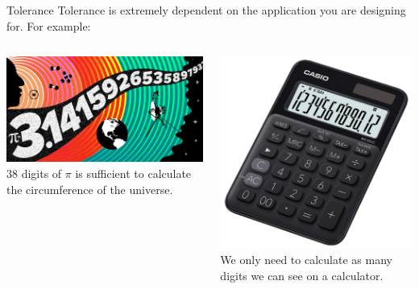 \documentclass[aspectratio=169,xcolor=dvipsnames]{beamer}
\begin{document}
\begin{frame}{Tolerance}
    Tolerance is extremely dependent on the application you are designing for. For example: \\ \vspace{0.3cm}
    \begin{columns}
        \begin{center}
            \includegraphics[scale=0.1]{images/piNasa.jpg} \\
            \small
            38 digits of $\pi$ is sufficient to calculate the circumference of the universe. \\ \vspace{0.1cm}
            \tiny
        \end{center}
        \begin{center}
            \includegraphics[scale=0.09]{images/calculator.jpg} \\
            \small
            We only need to calculate as many digits we can see on a calculator.
        \end{center}
    \end{columns}
\end{frame}
\end{document}

